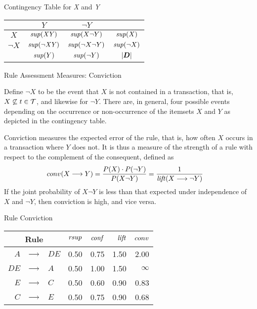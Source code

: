 \begin{frame}{Contingency Table for {\it X} and {\it Y}}
\begin{center}
\begin{tabular}{|c|cc||c|}
    \hline
    & $Y$ & $\neg Y$ & \\
    \hline
  $X$ & $\mathit{sup}(\mathit{XY})$ & $\mathit{sup}(X\neg Y)$ & $\mathit{sup}(X)$\\
  $\neg X$ & $\mathit{sup}(\neg \mathit{XY})$ & $\mathit{sup}(\neg X\neg Y)$ & $\mathit{sup}(\neg X)$\\
  \hline\hline
  & $\mathit{sup}(Y)$ & $\mathit{sup}(\neg Y)$ & $|{\boldsymbol D}|$\\
  \hline
  \end{tabular}%
\end{center}
\end{frame}

\begin{frame}{Rule Assessment Measures: Conviction}

Def\/{i}ne $\neg X$ to be the
event that $X$ is not contained in a transaction, that is,  $X
\not\subseteq t\in {\mathcal T}$, and likewise for $\neg Y$.  There are, in
general, four possible events depending on the occurrence or
non-occurrence of the itemsets $X$ and $Y$ as depicted in the
contingency table.

\medskip
Conviction 
measures the expected error of the rule, that is, how often
$X$ occurs in a transaction where $Y$ does not.
It is thus a measure of the strength of a rule with respect to the
complement of the consequent, def\/{i}ned as
\begin{align*}
  \conviction(X \arule Y) &
  = \frac{P(X) \cdot P(\neg Y)}{P(X \neg Y)}
  = \frac{1}{\lift(X \arule \neg Y)}
\end{align*}
If the joint
probability of $X\neg Y$ is less than that expected under independence
of $X$ and $\neg Y$, then
conviction is high, and vice versa. 
\end{frame}


\begin{frame}{Rule Conviction}
\begin{center}
\begin{tabular}{|r>{\centering}m{0.2in}l|r|r|r|r|}
\hline
\multicolumn{3}{|c|}{Rule}     & $\mathit{rsup}$ & $\mathit{conf}$ & $\mathit{lift}$    & $conv$\\ \hline
$\mathit{A}$   & $\arule$ & $\mathit{DE}$   & 0.50    & 0.75       & 1.50    & 2.00     \\ \hline
$\mathit{DE}$  & $\arule$ & $\mathit{A}$    & 0.50    & 1.00      & 1.50    & $\infty$ \\ \hline
$\mathit{E}$   & $\arule$ & $\mathit{C}$    & 0.50    & 0.60       & 0.90    & 0.83 \\ \hline
$\mathit{C}$   & $\arule$ & $\mathit{E}$    & 0.50    & 0.75       & 0.90    & 0.68 \\ \hline
\end{tabular}%
\end{center}
\end{frame}


